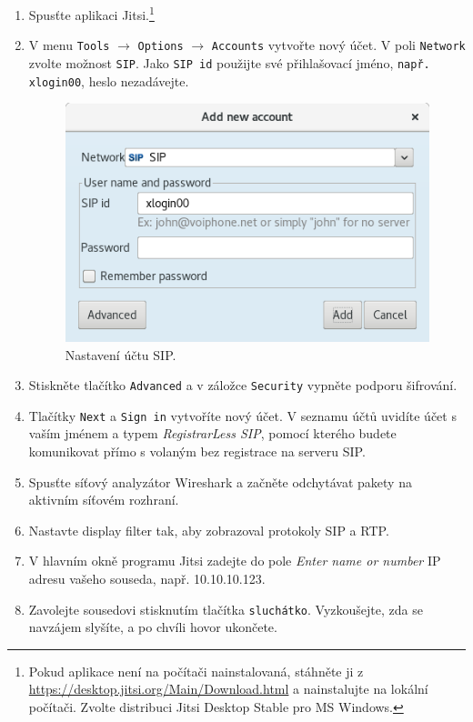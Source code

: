 \documentclass[a4paper,11pt]{article}
\begin{document}
\begin{enumerate}
    \item Spusťte aplikaci Jitsi.\footnote{Pokud aplikace není na počítači nainstalovaná, stáhněte ji z \url{https://desktop.jitsi.org/Main/Download.html} a nainstalujte na lokální počítači. Zvolte distribuci Jitsi Desktop Stable pro MS Windows.} 
    \item V menu {\tt Tools} $\rightarrow$ {\tt Options} $\rightarrow$ {\tt Accounts} vytvořte nový účet. V poli {\tt Network} zvolte možnost {\tt SIP}. Jako {\tt SIP id} použijte své přihlašovací jméno, {\tt např. xlogin00}, heslo nezadávejte.
    \begin{figure}[h]
    	\centering
    	\includegraphics[scale=0.37]{img/account_p2p.png}
    	\caption{Nastavení účtu SIP.}
    	\label{fig:sip_account}
    \end{figure}

    \item Stiskněte tlačítko {\tt Advanced} a v záložce {\tt Security} vypněte podporu šifrování.
    \item Tlačítky {\tt Next} a {\tt Sign in} vytvoříte nový účet. V seznamu účtů  uvidíte účet s vaším jménem a typem {\it RegistrarLess SIP}, pomocí kterého budete komunikovat přímo s volaným bez registrace na serveru SIP.
    \item Spusťte síťový analyzátor Wireshark a začněte odchytávat pakety na aktivním síťovém rozhraní.
    \item Nastavte display filter tak, aby zobrazoval protokoly SIP a RTP.
    \item V hlavním okně programu Jitsi zadejte do pole {\it Enter name or number} IP adresu vašeho souseda, např. 10.10.10.123.
    \item Zavolejte sousedovi stisknutím tlačítka {\tt sluchátko}. Vyzkoušejte, zda se navzájem slyšíte, a po chvíli hovor ukončete.
      

\end{enumerate}
\end{document}
